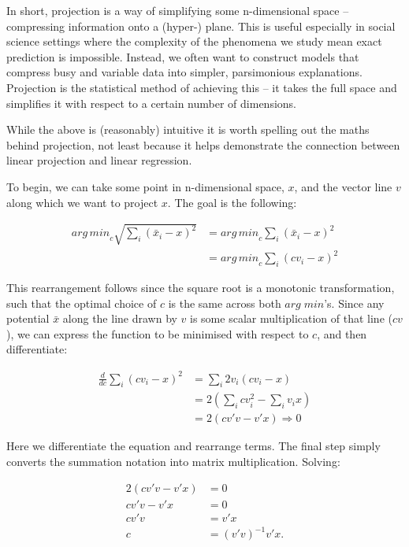 \documentclass[
]{book}
\begin{document}
In short, projection is a way of simplifying some n-dimensional space -- compressing information onto a (hyper-) plane. This is useful especially in social science settings where the complexity of the phenomena we study mean exact prediction is impossible. Instead, we often want to construct models that compress busy and variable data into simpler, parsimonious explanations. Projection is the statistical method of achieving this -- it takes the full space and simplifies it with respect to a certain number of dimensions.

While the above is (reasonably) intuitive it is worth spelling out the maths behind projection, not least because it helps demonstrate the connection between linear projection and linear regression.

To begin, we can take some point in n-dimensional space, \(x\), and the vector line \(v\) along which we want to project \(x\). The goal is the following:

\[
\begin{aligned}
{arg\,min}_c \sqrt{\sum_{i} (\bar{x}_i - x)^2} & = {arg\,min}_c \sum_{i} (\bar{x}_i - x)^2 \\
& = {arg\,min}_c \sum_{i} (cv_i - x)^2
\end{aligned}
\]

This rearrangement follows since the square root is a monotonic transformation, such that the optimal choice of \(c\) is the same across both \(arg\;min\)'s. Since any potential \(\bar{x}\) along the line drawn by \(v\) is some scalar multiplication of that line (\(cv\)), we can express the function to be minimised with respect to \(c\), and then differentiate:

\[
\begin{aligned}
\frac{d}{dc} \sum_{i} (cv_i - x)^2 & = \sum_{i}2v_i(cv_i - x) \\
& = 2(\sum_{i}cv_i^2  - \sum_{i}v_ix) \\
& = 2(cv'v - v'x) \Rightarrow 0
\end{aligned}
\]

Here we differentiate the equation and rearrange terms. The final step simply converts the summation notation into matrix multiplication. Solving:

\[
\begin{aligned}
2(cv'v - v'x) &= 0 \label{eq:dc_equal_zero} \\ 
cv'v - v'x &= 0 \\
cv'v &= v'x \\
c &= (v'v)^{-1}v'x.
\end{aligned}
\]
\end{document}
